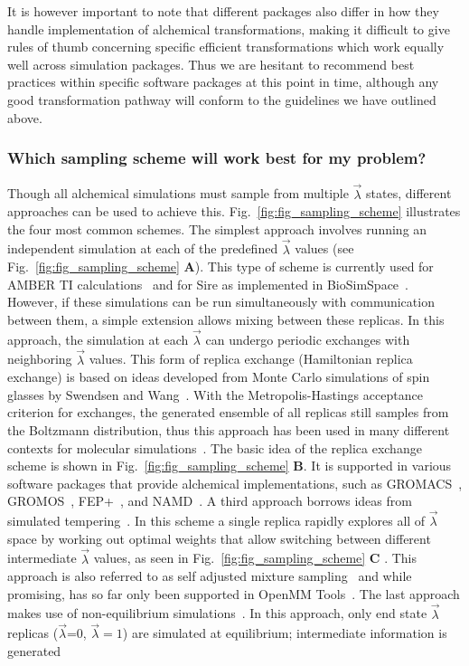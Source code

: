 \documentclass[9pt,bestpractices]{livecoms}
\begin{document}
It is however important to note that different packages also differ in how they handle implementation of alchemical transformations, making it difficult to give rules of thumb concerning specific efficient transformations which work equally well across simulation packages. Thus we are hesitant to recommend best practices within specific software packages at this point in time, although any good transformation pathway will conform to the guidelines we have outlined above.



\subsubsection{Which sampling scheme will work best for my problem?}
\label{sec:sampling_schemes}
Though all alchemical simulations must sample from multiple $\vec{\lambda}$ states, different approaches can be used to achieve this. Fig.~\ref{fig:fig_sampling_scheme} illustrates the four most common schemes. The simplest approach involves running an independent simulation at each of the predefined $\vec{\lambda}$ values (see Fig.~\ref{fig:fig_sampling_scheme} \textbf{A}). This type of scheme is currently used for AMBER TI calculations~\cite{song2019using} and for Sire as implemented in BioSimSpace~\cite{hedges2019biosimspace}. However, if these simulations can be run simultaneously with communication between them, a simple extension allows mixing between these replicas. In this approach, the simulation at each $\vec{\lambda}$ can undergo periodic exchanges with neighboring $\vec{\lambda}$ values. This form of replica exchange (Hamiltonian replica exchange) is based on ideas developed from Monte Carlo simulations of spin glasses by Swendsen and Wang~\cite{swendsen1986replica}. With the Metropolis-Hastings acceptance criterion for exchanges, the generated ensemble of all replicas still samples from the Boltzmann distribution, thus this approach has been used in many different contexts for molecular simulations~\cite{sugita2000multidimensionala,sugita1999replicaexchangea, woods2003developmenta, jiang2010free}. The basic idea of the replica exchange scheme is shown in Fig.~\ref{fig:fig_sampling_scheme} \textbf{B}. It is supported in various software packages that provide alchemical implementations, such as GROMACS~\cite{aldeghi2015accurate}, GROMOS~\cite{hritz2008hamiltoniana,hritz2007optimizationa}, FEP+~\cite{wang2015accurate}, and NAMD~\cite{jiang2019computing}. A third approach borrows ideas from simulated tempering~\cite{marinari1992simulateda}. In this scheme a single replica rapidly explores all of $\vec{\lambda}$ space by working out optimal weights that allow switching between different intermediate $\vec{\lambda}$ values, as seen in Fig.~\ref{fig:fig_sampling_scheme} \textbf{C} . This approach is also referred to as self adjusted mixture sampling~\cite{lyubartsev1992newa, li2007simulated, tan2017optimally} and while promising, has so far only been supported in OpenMM Tools~\cite{andrearizzi2019choderalab}. The last approach makes use of non-equilibrium simulations~\cite{aldeghi2018accurate}. In this approach, only end state $\vec{\lambda}$ replicas ($\vec{\lambda}$=0, $\vec{\lambda}=1$) are simulated at equilibrium; intermediate information is generated 
\end{document}
